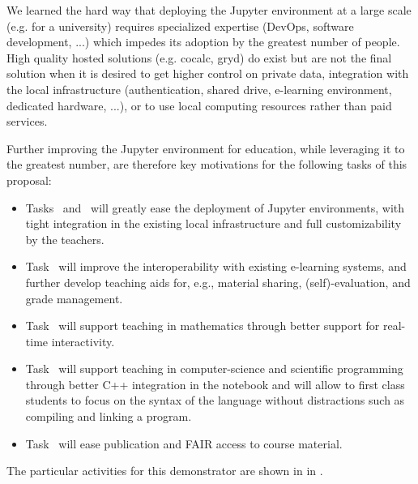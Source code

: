   We learned the hard way that deploying the Jupyter environment at a
  large scale (e.g. for a university) requires specialized expertise
  (DevOps, software development, ...) which impedes its adoption
  by the greatest number of people. High quality hosted solutions
  (e.g. cocalc, gryd) do exist but are not the final solution when it
  is desired to get higher control on private data, integration with
  the local infrastructure (authentication, shared drive, e-learning
  environment, dedicated hardware, ...), or to use local computing
  resources rather than paid services.

  Further improving the Jupyter environment for education, while
  leveraging it to the greatest number, are therefore key motivations
  for the following tasks of this proposal:
  \begin{itemize}
  \item Tasks~
    and~ will greatly ease the
    deployment of Jupyter environments, with tight integration in the
    existing local infrastructure and full customizability by the
    teachers.
  \item Task~ will improve the
    interoperability with existing e-learning systems, and further
    develop teaching aids for, e.g., material sharing,
    (self)-evaluation, and grade management.
  \item Task~ will support teaching
    in mathematics through better support for real-time interactivity.
  \item Task~ will support teaching
    in computer-science and scientific programming through
    better C++ integration in the notebook and will allow to first class students to focus on the
    syntax of the language without distractions such as compiling and
    linking a program.
  \item Task~ will ease publication and FAIR
    access to course material.
  \end{itemize}

  The particular activities for this demonstrator are shown in
   in .

